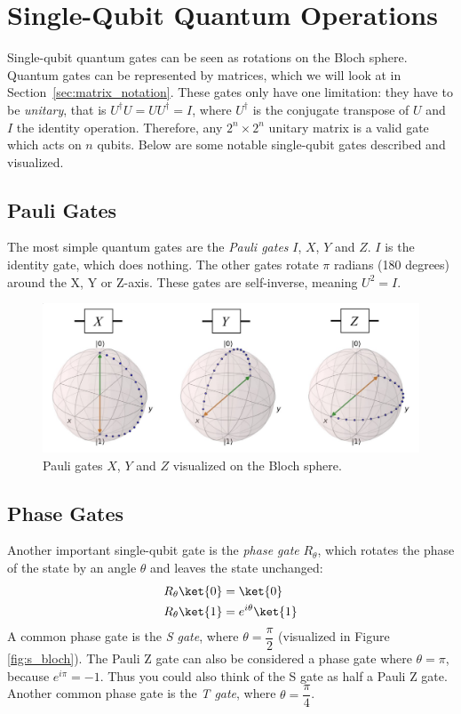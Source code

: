 \documentclass[11pt, notitlepage]{report}
\begin{document}
\section{Single-Qubit Quantum Operations}
Single-qubit quantum gates can be seen as rotations on the Bloch sphere. Quantum gates can be represented by matrices, which we will look at in Section~\ref{sec:matrix_notation}. These gates only have one limitation: they have to be \emph{unitary}, that is $U^\dagger U = UU^\dagger = I$, where $U^\dagger$ is the conjugate transpose of $U$ and $I$ the identity operation. Therefore, any $2^n \times 2^n$ unitary matrix is a valid gate which acts on $n$ qubits. Below are some notable single-qubit gates described and visualized.

\subsection{Pauli Gates}
 The most simple quantum gates are the \emph{Pauli gates} $I$, $X$, $Y$ and $Z$. $I$ is the identity gate, which does nothing. The other gates rotate $\pi$ radians (180 degrees) around the X, Y or Z-axis. These gates are self-inverse, meaning $U^2 = I$.

\begin{figure}[ht]
  \begin{adjustwidth}{-2.5cm}{-2.5cm}
  \centering
  \includegraphics[scale=0.2]{images/pauli_gates.eps}
  \caption{Pauli gates $X$, $Y$ and $Z$ visualized on the Bloch sphere.}
  \end{adjustwidth}
\end{figure}


\subsection{Phase Gates}
Another important single-qubit gate is the \emph{phase gate} $R_\theta$, which rotates the phase of the  state by an angle $\theta$ and leaves the  state unchanged:
\begin{align*}
R_\theta \ket{0} &= \ket{0} \\
R_\theta \ket{1} &= e^{i\theta}\ket{1}
\end{align*}
A common phase gate is the \emph{S gate}, where $\theta = \dfrac{\pi}{2}$ (visualized in Figure \ref{fig:s_bloch}). The Pauli Z gate can also be considered a phase gate where $\theta = \pi$, because $e^{i\pi} = -1$. Thus you could also think of the S gate as half a Pauli Z gate. Another common phase gate is the \emph{T gate}, where $\theta = \dfrac{\pi}{4}$.
\end{document}

